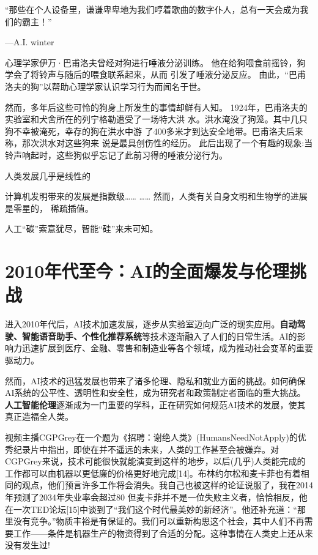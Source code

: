 “那些在个人设备里，谦谦卑卑地为我们哼着歌曲的数字仆人，总有一天会成为我们的霸主！”
\begin{flushright}
---A.I. winter
\end{flushright}

心理学家伊万·巴甫洛夫曾经对狗进行唾液分泌训练。
他在给狗喂食前摇铃，狗学会了将铃声与随后的喂食联系起来，从而
引发了唾液分泌反应。
由此，“巴甫洛夫的狗”以帮助心理学家认识学习行为而闻名于世。

然而，多年后这些可怜的狗身上所发生的事情却鲜有人知。
1924年，巴甫洛夫的实验室和犬舍所在的列宁格勒遭受了一场特大洪 水。洪水淹没了狗笼。其中几只狗不幸被淹死，幸存的狗在洪水中游 了400多米才到达安全地带。巴甫洛夫后来称，那次洪水对这些狗来 说是最具创伤性的经历。
此后出现了一个有趣的现象:当铃声响起时，这些狗似乎忘记了此前习得的唾液分泌行为。

人类发展几乎是线性的

计算机发明带来的发展是指数级……
……
然而，人类有关自身文明和生物学的进展是零星的， 稀疏插值。

人工“碳”索意犹尽，智能“硅”来未可知。

\section{2010年代至今：AI的全面爆发与伦理挑战}
进入2010年代后，AI技术加速发展，逐步从实验室迈向广泛的现实应用。{\bf 自动驾驶、智能语音助手、个性化推荐系统}等技术逐渐融入了人们的日常生活。AI的影响力迅速扩展到医疗、金融、零售和制造业等各个领域，成为推动社会变革的重要驱动力。

然而，AI技术的迅猛发展也带来了诸多伦理、隐私和就业方面的挑战。如何确保AI系统的公平性、透明性和安全性，成为研究者和政策制定者面临的重大挑战。{\bf 人工智能伦理}逐渐成为一门重要的学科，正在研究如何规范AI技术的发展，使其真正造福全人类。


视频主播CGPGrey在一个题为《招聘：谢绝人类》(HumansNeedNotApply)的优秀纪录片中指出，即使在并不遥远的未来，人类的工作甚至会被嫌弃。对CGPGrey来说，技术可能很快就能演变到这样的地步，以后(几乎)人类能完成的工作都可以由机器以更低廉的价格更好地完成[14]。布林约尔松和麦卡菲也有着相同的观点，他们预言许多工作将会消失。我自己也被这样的论证说服了，我在2014年预测了2034年失业率会超过80%
但麦卡菲并不是一位失败主义者，恰恰相反，他在一次TED论坛[15]中谈到了“我们这个时代最美妙的新经济”。他还补充道：“那里没有竞争。”物质丰裕是有保证的。我们可以重新构思这个社会，其中人们不再需要工作——条件是机器生产的物资得到了合适的分配。这种事情在人类史上还从来没有发生过!

